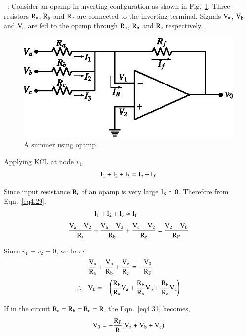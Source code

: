 \smallskip
{}~: Consider an opamp in inverting configuration as shown in Fig.~\ref{fig4.10}. Three resistors $\textrm{R}_{\textrm{a}}$, $\textrm{R}_{\textrm{b}}$ and $\textrm{R}_{\textrm{c}}$ are connected to the inverting terminal. Signals $\textrm{V}_{\textrm{a}}$, $\textrm{V}_{\textrm{b}}$ and $\textrm{V}_{\textrm{c}}$ are fed to the opamp through $\textrm{R}_{\textrm{a}}$, $\textrm{R}_{\textrm{b}}$ and $\textrm{R}_{\textrm{c}}$ respectively.
\begin{figure}[H]
\centering
\includegraphics{chap4/fig4.10.eps}
\caption{A summer using opamp}\label{fig4.10}
\end{figure}

Applying KCL at node $v_{1}$, 
\begin{equation}
\textrm{I}_{1}+\textrm{I}_{2}+\textrm{I}_{3}=\textrm{I}_{a}+\textrm{I}_{f}\label{eq4.29}
\end{equation}

Since input resistance $\textrm{R}_{\textrm{i}}$ of an opamp is very large $\textrm{I}_{\textrm{B}}\simeq 0$. Therefore from Eqn.~\eqref{eq4.29}.
\begin{align}
\textrm{I}_{1}+\textrm{I}_{2}+\textrm{I}_{3} &\simeq \textrm{I}_{\textrm{f}}\notag\\[3pt]
\frac{\textrm{V}_{\textrm{a}}-\textrm{V}_{2}}{\textrm{R}_{\textrm{a}}}+\frac{\textrm{V}_{\textrm{b}}-\textrm{V}_{2}}{\textrm{R}_{\textrm{b}}} &+ \frac{\textrm{V}_{\textrm{c}}-\textrm{V}_{2}}{\textrm{R}_{\textrm{c}}}=\frac{\textrm{V}_{2}-\textrm{V}_{0}}{\textrm{R}_{\textrm{F}}}\label{eq4.30}
\end{align}

Since $v_{1}=v_{2}=0$, we have
\begin{align}
& \frac{\textrm{V}_{\textrm{a}}}{\textrm{R}_{\textrm{a}}}+\frac{\textrm{V}_{\textrm{b}}}{\textrm{R}_{\textrm{b}}}+\frac{\textrm{V}_{\textrm{c}}}{\textrm{R}_{\textrm{c}}}=-\frac{\textrm{V}_{0}}{\textrm{R}_{\textrm{F}}}\notag\\[3pt]
\therefore\quad & \textrm{V}_{0}=-\left(\frac{\textrm{R}_{\textrm{F}}}{\textrm{R}_{\textrm{a}}}\textrm{V}_{\textrm{a}}+\frac{\textrm{R}_{\textrm{F}}}{\textrm{R}_{\textrm{b}}}\textrm{V}_{\textrm{b}}+\frac{\textrm{R}_{\textrm{F}}}{\textrm{R}_{\textrm{c}}}\textrm{V}_{\textrm{c}}\right)\label{eq4.31}
\end{align}

If in the circuit $\textrm{R}_{\textrm{a}}=\textrm{R}_{\textrm{b}}=\textrm{R}_{\textrm{c}}=\textrm{R}$, the Eqn.~\eqref{eq4.31} becomes,
\begin{equation}
\textrm{V}_{0}=-\frac{\textrm{R}_{\textrm{F}}}{\textrm{R}}(\textrm{V}_{\textrm{a}}+\textrm{V}_{\textrm{b}}+\textrm{V}_{\textrm{c}})\label{eq4.32}
\end{equation}

